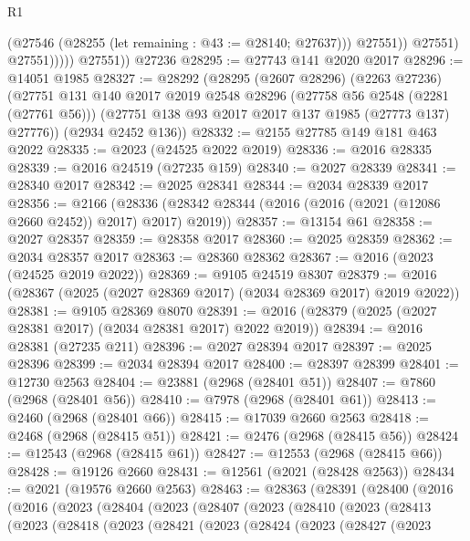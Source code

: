 \begin{lexlean}{R1}
\begin{coremodule}
                        (@27546 (@28255 (let remaining : @43 := @28140; @27637)))
                        @27551))
                    @27551)
                  @27551)))))
        @27551))
    @27236
@28295 := @27743 @141 @2020 @2017
@28296 := @14051 @1985
@28327 := @28292
    (@28295
      (@2607 @28296)
      (@2263 @27236)
      (@27751
        @131
        @140
        @2017
        @2019
        @2548
        @28296
        (@27758 @56 @2548 (@2281 (@27761 @56)))
        (@27751 @138 @93 @2017 @2017 @137 @1985 (@27773 @137) @27776))
      (@2934 @2452 @136))
@28332 := @2155 @27785 @149 @181 @463 @2022
@28335 := @2023 (@24525 @2022 @2019)
@28336 := @2016 @28335
@28339 := @2016 @24519 (@27235 @159)
@28340 := @2027 @28339
@28341 := @28340 @2017
@28342 := @2025 @28341
@28344 := @2034 @28339 @2017
@28356 := @2166
    (@28336 (@28342 @28344 (@2016 (@2016 (@2021 (@12086 @2660 @2452)) @2017) @2017) @2019))
@28357 := @13154 @61
@28358 := @2027 @28357
@28359 := @28358 @2017
@28360 := @2025 @28359
@28362 := @2034 @28357 @2017
@28363 := @28360 @28362
@28367 := @2016 (@2023 (@24525 @2019 @2022))
@28369 := @9105 @24519 @8307
@28379 := @2016 (@28367 (@2025 (@2027 @28369 @2017) (@2034 @28369 @2017) @2019 @2022))
@28381 := @9105 @28369 @8070
@28391 := @2016 (@28379 (@2025 (@2027 @28381 @2017) (@2034 @28381 @2017) @2022 @2019))
@28394 := @2016 @28381 (@27235 @211)
@28396 := @2027 @28394 @2017
@28397 := @2025 @28396
@28399 := @2034 @28394 @2017
@28400 := @28397 @28399
@28401 := @12730 @2563
@28404 := @23881 (@2968 (@28401 @51))
@28407 := @7860 (@2968 (@28401 @56))
@28410 := @7978 (@2968 (@28401 @61))
@28413 := @2460 (@2968 (@28401 @66))
@28415 := @17039 @2660 @2563
@28418 := @2468 (@2968 (@28415 @51))
@28421 := @2476 (@2968 (@28415 @56))
@28424 := @12543 (@2968 (@28415 @61))
@28427 := @12553 (@2968 (@28415 @66))
@28428 := @19126 @2660
@28431 := @12561 (@2021 (@28428 @2563))
@28434 := @2021 (@19576 @2660 @2563)
@28463 := @28363
    (@28391
      (@28400
        (@2016
          (@2016
            (@2023
              (@28404
                (@2023
                  (@28407
                    (@2023
                      (@28410
                        (@2023
                          (@28413
                            (@2023
                              (@28418
                                (@2023
                                  (@28421
                                    (@2023
                                      (@28424
                                        (@2023
                                          (@28427
                                            (@2023

\end{coremodule}
\end{lexlean}
